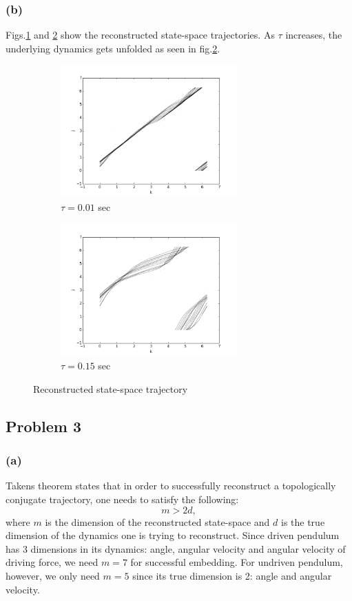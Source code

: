 \documentclass{article}
\begin{document}
\subsubsection*{(b)}
Figs.\ref{q2b_1} and \ref{q2b_2} show the reconstructed state-space trajectories. As $\tau$ increases, the underlying dynamics gets unfolded as seen in fig.\ref{q2b_2}.

\begin{figure}
\centering
\begin{subfigure}{.5\textwidth}
  \centering
  \includegraphics[height=2in]{figs/q2b_10.png}
  \caption{$\tau = 0.01$ sec}
  \label{q2b_1}
\end{subfigure}%
\begin{subfigure}{.5\textwidth}
  \centering
  \includegraphics[height=2in]{figs/q2b_150.png}
  \caption{$\tau = 0.15$ sec}
  \label{q2b_2}
\end{subfigure}
\caption{Reconstructed state-space trajectory}
\label{q2b}
\end{figure}

\subsection*{Problem 3}
\subsubsection*{(a)}
Takens theorem states that in order to successfully reconstruct a topologically conjugate trajectory, one needs to satisfy the following:
\[
	m > 2d,
\]
where $m$ is the dimension of the reconstructed state-space and $d$ is the true dimension of the dynamics one is trying to reconstruct. Since driven pendulum has 3 dimensions in its dynamics: angle, angular velocity and angular velocity of driving force, we need $m = 7$ for successful embedding. For undriven pendulum, however, we only need $m = 5$ since its true dimension is 2: angle and angular velocity. 
\end{document}
